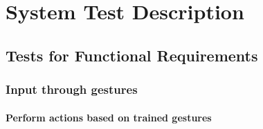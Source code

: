\documentclass[12pt, titlepage]{article}
\begin{document}
\section{System Test Description}
	
\subsection{Tests for Functional Requirements}

\subsubsection{Input through gestures}
		
\paragraph{Perform actions based on trained gestures}
\end{document}
